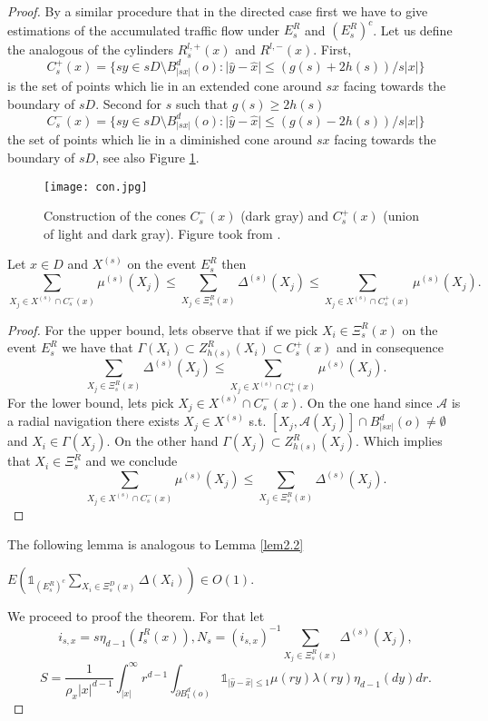 \begin{proof}
By a similar procedure that in the directed case first we have to give estimations of the accumulated traffic flow under $E^R_s$ and $(E^R_s)^c$. Let us define the analogous of the cylinders $R^{l,+}_s(x)$ and $R^{l,-}(x)$. First, $$C^+_s(x)=\lbrace sy\in sD\setminus B^d_{\vert sx\vert}(o):\vert\hat{y}-\hat{x}\vert\leq(g(s)+2h(s))/s\vert x\vert\rbrace $$ is the set of points which lie in an extended cone around $sx$ facing towards the boundary of $sD$. Second for $s$ such that $g(s)\geq 2h(s)$
 $$C^-_s(x)=\lbrace sy\in sD\setminus B^d_{\vert sx\vert}(o):\vert\hat{y}-\hat{x}\vert\leq(g(s)-2h(s))/s\vert x\vert\rbrace $$ the set of points which lie in a diminished cone around $sx$ facing towards the boundary of $sD$, see also Figure \ref{fig.3.3}.  
 \begin{figure}
 \captionsetup{width=1\textwidth}
\centering
\texttt{[image: con.jpg]}
\caption{Construction of the cones $C^-_s(x)$ (dark gray) and $C^+_s(x)$ (union of light and dark gray). Figure took from \cite{WIAS}.}
\label{fig.3.3}
\end{figure}

\begin{lem}\label{lem3.1}
 Let $x\in D$ and $X^{(s)}$ on the event $E_{s}^R$ then
 $$\sum_{X_j\in X^{(s)}\cap C^-_s(x)}\mu^{(s)}(X_j)\leq\sum_{X_j\in  \Xi^{R}_{s}(x)}\Delta^{(s)}(X_j)\leq\sum_{X_j\in X^{(s)}\cap C^{+}_{s}(x)}\mu^{(s)}(X_j).$$
 \end{lem}
\begin{proof}
For the upper bound, lets observe that if we pick $X_i \in \Xi_s^R(x)$ on the event $E^{R}_s$ we have that $\Gamma(X_i)\subset Z^R_{h(s)}(X_i)\subset C^{+}_s(x)$ and in consequence
 $$\sum_{X_j\in  \Xi^{R}_{s}(x)}\Delta^{(s)}(X_j)\leq\sum_{X_j\in X^{(s)}\cap C^{+}_{s}(x)}\mu^{(s)}(X_j).$$
 For the lower bound, lets pick $X_j\in X^{(s)}\cap C^-_s(x)$. On the one hand since $\mathcal{A}$ is a radial navigation there exists $X_{j}\in X^{(s)}$ s.t. $[X_{j},\mathcal{A}(X_j)]\cap B^d_{\vert sx\vert}(o)\neq \emptyset$ and $X_i\in\Gamma (X_j)$. On the other hand $\Gamma (X_j)\subset Z^R_{h(s)}(X_j)$. Which implies that $X_i\in \Xi_s^R$  and we conclude 
$$\sum_{X_j\in X^{(s)}\cap C^-_s(x)}\mu^{(s)}(X_j)\leq\sum_{X_j\in  \Xi^{R}_{s}(x)}\Delta^{(s)}(X_j).$$
 \end{proof} 
 
 The following lemma is analogous to Lemma \ref{lem2.2}
 \begin{lem}\label{lem3.2} $E(\mathds{1}_{(E^{R}_s)^c}\sum_{X_i\in\Xi_s^D(x)}\Delta(X_i))\in O(1)$.
 \end{lem}
We proceed to proof the theorem. For that let $$i_{s, x}=s\eta_{d-1}(I^R_s(x)), N_s=(i_{s, x})^{-1}\sum_{X_j\in  \Xi^{R}_{s}(x)}\Delta^{(s)}(X_j),$$ $$ S=\frac{1}{\rho_x\vert x\vert^{d-1}}\int_{\vert x\vert}^{\infty} r^{d-1}\int_{\partial B^d_1(o)} \mathds{1}_{\vert \hat{y}-\hat{x}\vert \leq 1}\mu(ry)\lambda(ry)\eta_{d-1}(dy) dr.$$
 

\end{proof}
